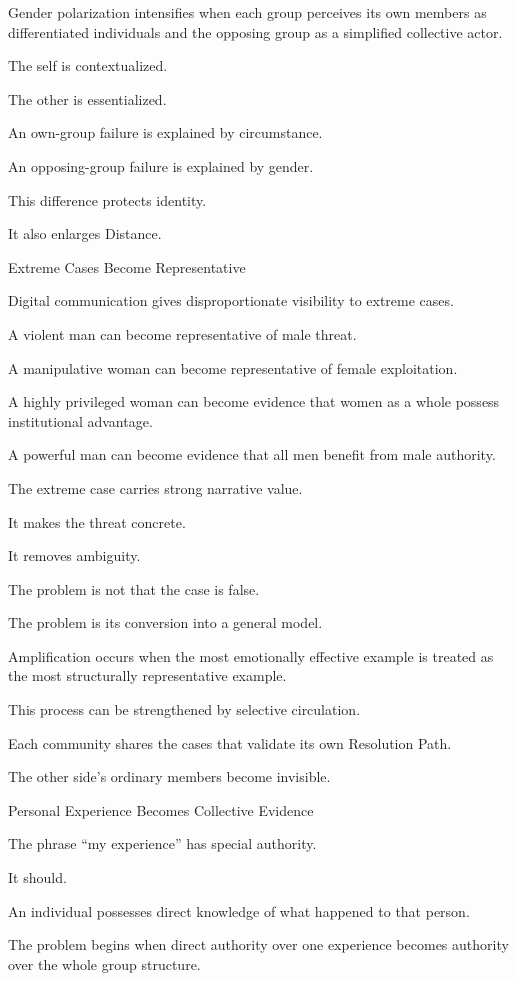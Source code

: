 Gender polarization intensifies when each group perceives its own members as differentiated individuals and the opposing group as a simplified collective actor.

The self is contextualized.

The other is essentialized.

An own-group failure is explained by circumstance.

An opposing-group failure is explained by gender.

This difference protects identity.

It also enlarges Distance.

Extreme Cases Become Representative

Digital communication gives disproportionate visibility to extreme cases.

A violent man can become representative of male threat.

A manipulative woman can become representative of female exploitation.

A highly privileged woman can become evidence that women as a whole possess institutional advantage.

A powerful man can become evidence that all men benefit from male authority.

The extreme case carries strong narrative value.

It makes the threat concrete.

It removes ambiguity.

The problem is not that the case is false.

The problem is its conversion into a general model.

Amplification occurs when the most emotionally effective example is treated as the most structurally representative example.

This process can be strengthened by selective circulation.

Each community shares the cases that validate its own Resolution Path.

The other side’s ordinary members become invisible.

Personal Experience Becomes Collective Evidence

The phrase “my experience” has special authority.

It should.

An individual possesses direct knowledge of what happened to that person.

The problem begins when direct authority over one experience becomes authority over the whole group structure.

